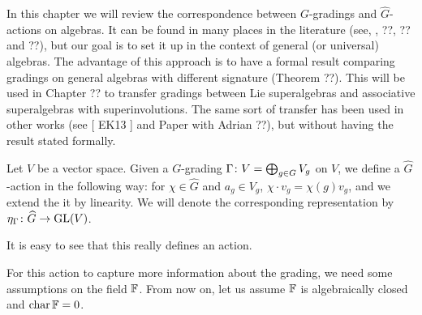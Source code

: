 In this chapter we will review the correspondence between $G$-gradings and $\widehat G$-actions on algebras. 
It can be found in many places in the literature (see, \eg, ??, ?? and ??), but our goal is to set it up in the context of general (or universal) algebras. 
The advantage of this approach is to have a formal result comparing gradings
on  general  algebras  with  different  signature  (Theorem  ??).
This will be used in Chapter ??  to transfer gradings between Lie superalgebras and
associative superalgebras with superinvolutions.  The same sort of transfer has been
used in other works (see [
EK13
] and Paper with Adrian ??), but without having the
result stated formally.







\begin{defi}
    Let $V$ be a vector space. 
    Given a $G$-grading $\Gamma\colon V= \bigoplus_{g\in G} V_g$ on $V$, we define a $\widehat G$-action in the following way: for $\chi \in \widehat G$ and $a_g \in V_g$, $\chi \cdot v_g = \chi(g)v_g$, and we extend the it by linearity. 
    We will denote the corresponding representation by $\eta_\Gamma\colon \widehat G \to \operatorname{GL}(V)$.
\end{defi}

It is easy to see that this really defines an action. 

For this action to capture more information about the grading, we need some assumptions on the field $\mathbb{F}$. 
From now on, let us assume $\mathbb{F}$ is algebraically closed and $\operatorname{char} \mathbb{F} = 0$.


